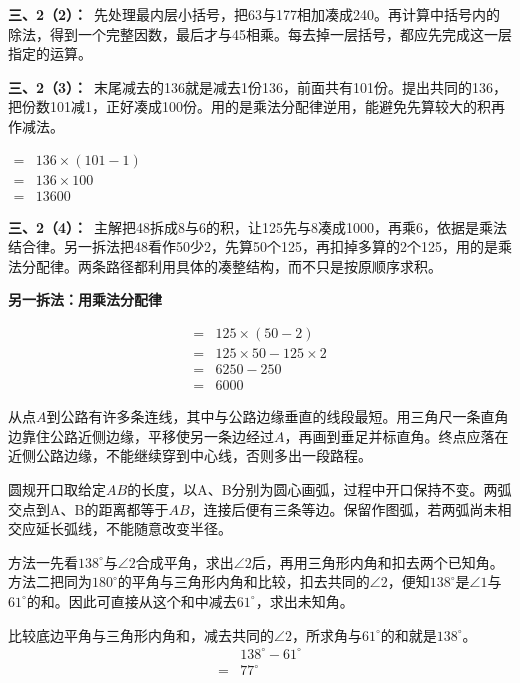 \documentclass[multi=snippet,border=0pt]{standalone}
\newenvironment{snippet}[3]{\begin{minipage}{#1bp}\color{answerred}\fontsize{#2}{#3}\selectfont\raggedright}{\end{minipage}}
\begin{document}
\begin{snippet}{505}{11.5}{14}\textbf{三、2（2）：}\ 先处理最内层小括号，把63与177相加凑成240。再计算中括号内的除法，得到一个完整因数，最后才与45相乘。每去掉一层括号，都应先完成这一层指定的运算。\end{snippet}
\begin{snippet}{505}{11.5}{14}\textbf{三、2（3）：}\ 末尾减去的136就是减去1份136，前面共有101份。提出共同的136，把份数101减1，正好凑成100份。用的是乘法分配律逆用，能避免先算较大的积再作减法。\end{snippet}
\begin{snippet}{157.0}{10.5}{12.8}\(\begin{aligned}={}&136\times(101-1)\\={}&136\times100\\={}&13600\end{aligned}\)\end{snippet}
\begin{snippet}{505}{11.5}{14}\textbf{三、2（4）：}\ 主解把48拆成8与6的积，让125先与8凑成1000，再乘6，依据是乘法结合律。另一拆法把48看作50少2，先算50个125，再扣掉多算的2个125，用的是乘法分配律。两条路径都利用具体的凑整结构，而不只是按原顺序求积。\par \textbf{另一拆法：用乘法分配律}\par \[\begin{aligned}={}&125\times(50-2)\\={}&125\times50-125\times2\\={}&6250-250\\={}&6000\end{aligned}\]\end{snippet}
\begin{snippet}{505}{11.5}{14}从点\(A\)到公路有许多条连线，其中与公路边缘垂直的线段最短。用三角尺一条直角边靠住公路近侧边缘，平移使另一条边经过\(A\)，再画到垂足并标直角。终点应落在近侧公路边缘，不能继续穿到中心线，否则多出一段路程。\end{snippet}
\begin{snippet}{505}{11.5}{14}圆规开口取给定\(AB\)的长度，以A、B分别为圆心画弧，过程中开口保持不变。两弧交点到A、B的距离都等于\(AB\)，连接后便有三条等边。保留作图弧，若两弧尚未相交应延长弧线，不能随意改变半径。\end{snippet}
\begin{snippet}{505}{11.5}{14}方法一先看\(138^\circ\)与\(\angle2\)合成平角，求出\(\angle2\)后，再用三角形内角和扣去两个已知角。方法二把同为\(180^\circ\)的平角与三角形内角和比较，扣去共同的\(\angle2\)，便知\(138^\circ\)是\(\angle1\)与\(61^\circ\)的和。因此可直接从这个和中减去\(61^\circ\)，求出未知角。\par 比较底边平角与三角形内角和，减去共同的\(\angle2\)，所求角与\(61^\circ\)的和就是\(138^\circ\)。\[\begin{aligned}&138^\circ-61^\circ\\={}&77^\circ\end{aligned}\]\end{snippet}
\end{document}
